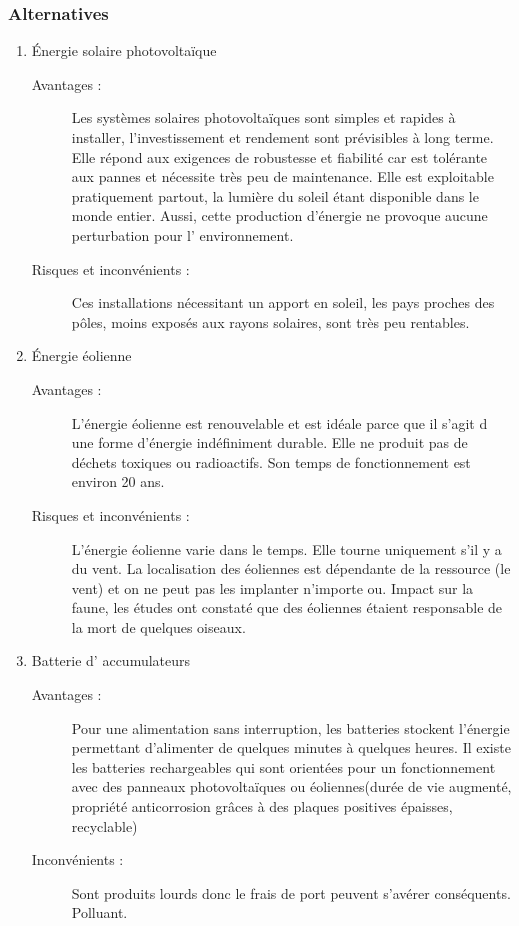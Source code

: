 \subsubsection{Alternatives}
\begin{enumerate}
\item Énergie solaire photovolta\"ique
\begin{description}
\item [Avantages : ]
Les syst\`emes solaires photovoltaïques sont simples et rapides à installer, l'investissement  et rendement sont pr\'{e}visibles à long terme.
Elle r\'{e}pond aux exigences de robustesse et fiabilit\'{e} car est tolérante aux pannes et n\'{e}cessite tr\`es peu de maintenance. 
Elle est exploitable pratiquement partout, la lumi\`ere du soleil \'{e}tant disponible dans le monde entier. 
Aussi, cette production d'\'{e}nergie ne provoque aucune perturbation pour l' environnement.

\item [Risques et inconv\'enients : ]
Ces installations n\'{e}cessitant un apport en soleil, les pays proches des pôles, moins expos\'{e}s aux rayons solaires, sont tr\`es peu rentables.
\end{description}

\item Énergie \'{e}olienne
\begin{description}
\item [Avantages : ]
L'\'{e}nergie \'{e}olienne est renouvelable et est id\'{e}ale parce que il s'agit d une forme d'\'{e}nergie ind\'{e}finiment durable.
Elle ne produit pas de d\'{e}chets toxiques ou radioactifs. 
Son temps de fonctionnement est environ 20 ans.

\item [Risques et inconv\'{e}nients : ]
L'\'{e}nergie \'{e}olienne varie dans le temps.  Elle tourne uniquement s'il y a du vent.
La localisation des \'{e}oliennes est d\'{e}pendante de la ressource (le vent) et on ne peut pas les implanter n'importe ou. 
Impact sur la faune, les \'{e}tudes ont constat\'{e} que des \'{e}oliennes \'{e}taient responsable de la mort de quelques oiseaux.
\end{description}


\item Batterie d' accumulateurs
\begin{description}
\item [Avantages : ]
Pour une alimentation sans interruption, les batteries stockent l'énergie permettant d'alimenter de quelques minutes à quelques heures.
Il existe les batteries rechargeables qui sont orient\'{e}es pour un fonctionnement avec des panneaux photovoltaïques ou  \'{e}oliennes(dur\'{e}e de vie augment\'{e}, propriét\'{e} anticorrosion grâces à des plaques positives \'{e}paisses, recyclable)

\item [Inconv\'{e}nients : ]
Sont produits lourds donc le frais de port peuvent s'av\'{e}rer cons\'{e}quents.
Polluant.

\end{description}
\end{enumerate}

